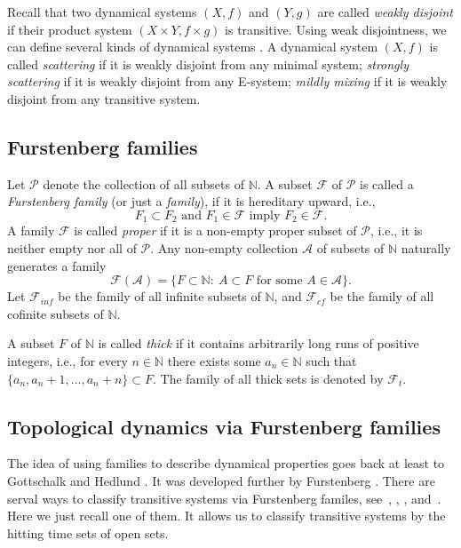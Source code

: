 \documentclass[12pt,a4paper]{amsart}
\theoremstyle{definition}
\numberwithin{equation}{section}
\begin{document}
Recall that two dynamical systems $(X,f)$ and $(Y,g)$ are called \emph{weakly disjoint}
if their product system $(X\times Y,f\times g)$ is transitive.
Using weak disjointness, we can define several kinds of dynamical systems \cite{BHM00,HY04}.
A dynamical system $(X, f)$ is called \emph{scattering} if it is weakly disjoint from any  minimal system;
\emph{strongly scattering} if it is weakly disjoint from any E-system;
\emph{mildly mixing} if it is weakly disjoint from any transitive system.

\subsection{Furstenberg families}
Let $\mathcal{P}$ denote the collection of all subsets of $\mathbb{N}$.
A subset $\mathcal F$ of $\mathcal P$ is called a \emph{Furstenberg family} (or just a \emph{family}),
if it is hereditary upward, i.e.,
\[\text{$F_1 \subset F_2$ and $F_1\in\mathcal F$ imply $F_2\in\mathcal{F}$.} \]
 A family $\mathcal{F}$ is called \emph{proper} if it is a non-empty
proper subset of $\mathcal P$,
i.e., it is neither empty nor all of $\mathcal P$.
Any non-empty collection $\mathcal A$ of subsets of $\mathbb{N}$ naturally generates a family
\[\mathcal F(\mathcal A) = \{F\subset\mathbb{N}:\ A \subset F \text{ for some } A\in\mathcal {A}\}.\]
Let $\mathcal F_{inf}$ be the family of all infinite subsets of $\mathbb{N}$,
and $\mathcal F_{cf}$ be the family of all cofinite subsets of $\mathbb{N}$.

A subset $F$ of $\mathbb{N}$ is called \emph{thick} if it contains arbitrarily long runs of positive integers,
i.e., for every $n\in\mathbb{N}$ there exists some $a_n\in\mathbb{N}$ such that $\{a_n, a_n+1,\dotsc, a_n+n\}\subset F$.
The family of all thick sets is denoted by $\mathcal F_{t}$.

\subsection{Topological dynamics via Furstenberg families}
The idea of using families to describe dynamical properties goes back at least to Gottschalk and Hedlund \cite{GH55}.
It was developed further by Furstenberg \cite{F81}.
There are serval ways to classify transitive systems via Furstenberg familes,
see~\cite{A97}, \cite{G04}, \cite{HY04}, \cite{W-Huang-X-Ye-2005} and~\cite{L2011}.
Here we just recall one of them.
It allows us to classify transitive systems by the hitting time sets of open sets.
\end{document}
